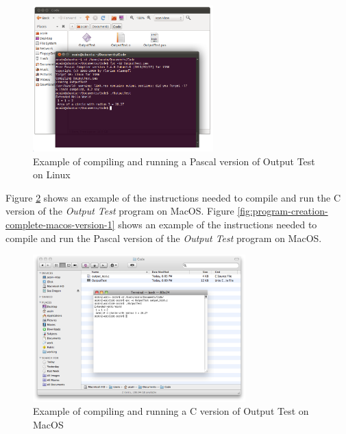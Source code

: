 \begin{figure}[h]
   \centering
   \includegraphics[width=0.62\textwidth]{./topics/program-creation/images/LinuxCompleteExample} 
   \caption{Example of compiling and running a Pascal version of Output Test on Linux}
   \label{fig:program-creation-complete-linux-version-1}
\end{figure}

\clearpage
Figure \ref{fig:program-creation-complete-macos-version} shows an example of the instructions needed to compile and run the C version of the \emph{Output Test} program on MacOS. Figure \ref{fig:program-creation-complete-macos-version-1} shows an example of the instructions needed to compile and run the Pascal version of the \emph{Output Test} program on MacOS.

\begin{figure}[h]
   \centering
   \includegraphics[width=0.73\textwidth]{./topics/program-creation/images/MacOSCompleteExample1} 
   \caption{Example of compiling and running a C version of Output Test on MacOS}
   \label{fig:program-creation-complete-macos-version}
\end{figure}

